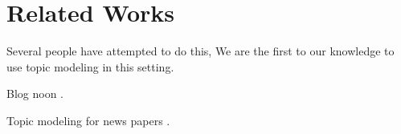 \section{Related Works}

Several people have attempted to do this,
We are the first to our knowledge to use topic modeling in this setting.

Blog noon \cite{Grineva:2011:BET:1963192.1963292}.

Topic modeling for news papers \cite{yang2011topic}.

